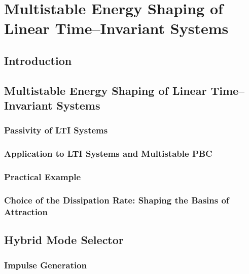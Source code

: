 
\chapter{Multistable Energy Shaping of Linear Time--Invariant Systems}

\label{chap:multistable}
\minitoc

\thispagestyle{empty}

\newpage
\section{Introduction}
%

%
\section{Multistable Energy Shaping of Linear Time--Invariant Systems}\label{sec:MES}
\subsection{Passivity of LTI Systems}
\subsection{Application to LTI Systems and Multistable PBC}
\subsection{Practical Example}
\subsection{Choice of the Dissipation Rate: Shaping the Basins of Attraction}
%

\section{Hybrid Mode Selector}
\subsection{Impulse Generation}
